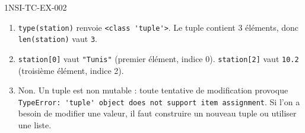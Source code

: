 \begin{corrige}{1NSI-TC-EX-002}
\begin{enumerate}
  \item \lstinline{type(station)} renvoie \lstinline{<class 'tuple'>}.
        Le tuple contient 3 éléments, donc \lstinline{len(station)} vaut \lstinline{3}.

  \item \lstinline{station[0]} vaut \lstinline{"Tunis"} (premier élément, indice 0).
        \lstinline{station[2]} vaut \lstinline{10.2} (troisième élément, indice 2).

  \item Non. Un tuple est non mutable : toute tentative de modification provoque
        \lstinline{TypeError: 'tuple' object does not support item assignment}.
        Si l'on a besoin de modifier une valeur, il faut construire un nouveau tuple
        ou utiliser une liste.
\end{enumerate}
\end{corrige}
